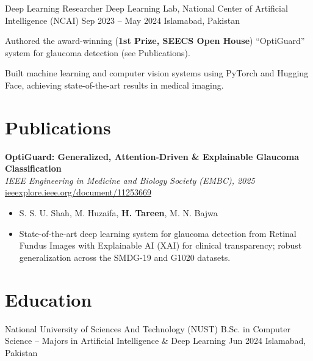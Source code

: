 \documentclass[letterpaper]{resume_config}
\begin{document}
\WorkExperience
    {Deep Learning Researcher} %
    {Deep Learning Lab, National Center of Artificial Intelligence (NCAI)} %
    {Sep 2023 -- May 2024} %
    {Islamabad, Pakistan} %
    {
        \item Authored the award-winning (\textbf{1st Prize, SEECS Open House}) ``OptiGuard'' system for glaucoma detection (see Publications).
        \item Built machine learning and computer vision systems using PyTorch and Hugging Face, achieving state-of-the-art results in medical imaging.
    }


\section{Publications}

\noindent \textbf{OptiGuard: Generalized, Attention-Driven \& Explainable Glaucoma Classification} \\
\textit{IEEE Engineering in Medicine and Biology Society (EMBC), 2025} \hfill \href{https://ieeexplore.ieee.org/document/11253669}{\small ieeexplore.ieee.org/document/11253669}
\vspace{-2pt}
\begin{itemize}[noitemsep, topsep=2pt, leftmargin=1em, parsep=0pt, partopsep=0pt]
    \item S. S. U. Shah, M. Huzaifa, \textbf{H. Tareen}, M. N. Bajwa
    \item State-of-the-art deep learning system for glaucoma detection from Retinal Fundus Images with Explainable AI (XAI) for clinical transparency; robust generalization across the SMDG-19 and G1020 datasets.
\end{itemize}


\section{Education}

\EducationExperience
    {National University of Sciences And Technology (NUST)} %
    {B.Sc. in Computer Science -- Majors in Artificial Intelligence \& Deep Learning} %
    {Jun 2024} %
    {Islamabad, Pakistan} %
\end{document}
